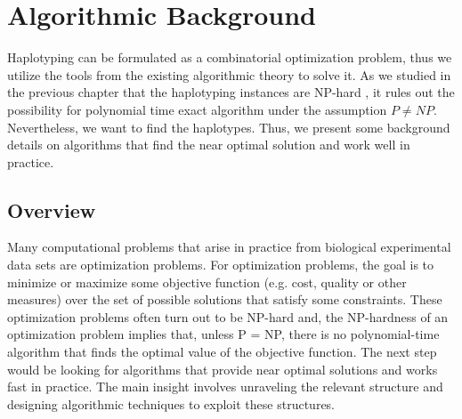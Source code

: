 \chapter{Algorithmic Background}
Haplotyping can be formulated as a combinatorial optimization problem, thus we utilize the tools from  the existing algorithmic theory to solve it.
As we studied in the previous chapter that the haplotyping instances are NP-hard \citep{Cilibrasi2007}, it rules out the possibility for polynomial time exact algorithm under the assumption $P \neq NP$.
Nevertheless, we want to find the haplotypes. Thus, we present some background details on algorithms that find the near optimal solution and work well in practice.


\section{Overview}
Many computational problems that arise in practice from biological experimental data sets are optimization problems.
For optimization problems, the goal is to minimize or maximize some objective function (e.g. cost, quality or other measures) over the set of possible solutions that satisfy some constraints.
These optimization problems often turn out to be NP-hard and, the
NP-hardness of an optimization problem implies that, unless P = NP, there is no polynomial-time algorithm
that finds the optimal value of the objective function. 
The next step would be looking for algorithms that provide near optimal solutions and works fast in practice. 
The main insight involves unraveling the relevant structure and designing algorithmic
techniques to exploit these structures.

